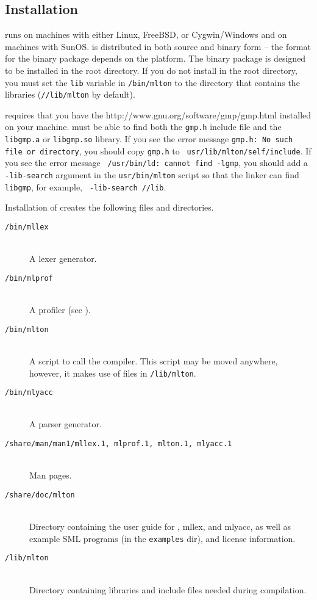 %
\subsection{Installation}
%
{\mlton} runs on {\intel} machines with either Linux, FreeBSD, or
Cygwin/Windows and on {\sparc} machines with SunOS.  {\mlton} is
distributed in both source and binary form -- the format for the
binary package depends on the platform.  The binary package is
designed to be installed in the root directory.  If you do not install
{\mlton} in the root directory, you must set the {\tt lib} variable in
{\tt \prefix/bin/mlton} to the directory that contains the libraries
({\tt /\prefix/lib/mlton} by default).

{\mlton} requires that you have the
		  {http://www.gnu.org/software/gmp/gmp.html}
installed on your machine.  {\mlton} must be able to find both the
{\tt gmp.h} include file and the {\tt libgmp.a} or {\tt libgmp.so}
library. If you see the error message {\tt gmp.h: No such file or
directory}, you should copy {\tt gmp.h} to {\tt
usr/lib/mlton/self/include}.  If you see the error message {\tt
/usr/bin/ld: cannot find -lgmp}, you 
should add a {\tt -lib-search} argument in the {\tt usr/bin/mlton}
script so that the linker can find {\tt libgmp}, for example, {\tt
-lib-search /\prefix/lib}.

Installation of {\mlton} creates the following files and directories.

\newcommand{\place}[1]{\item[\tt #1]\hspace{1in}\\}

\begin{description}

\place{\prefix/bin/mllex}
A lexer generator.

\place{\prefix/bin/mlprof}
A profiler (see ).

\place{\prefix/bin/mlton}
A script to call the compiler.
This script may be moved anywhere, however,
it makes use of files in {\tt \prefix/lib/mlton}.

\place{\prefix/bin/mlyacc}
A parser generator.

\place{\prefix/share/man/man1/mllex.1, mlprof.1, mlton.1, mlyacc.1}
Man pages.

\place{\prefix/share/doc/mlton}
Directory containing the user guide for {\mlton}, mllex, and mlyacc,
as well as example SML programs (in the {\tt examples} dir), and
license information.

\place{\prefix/lib/mlton}
Directory containing libraries and include files needed during
compilation.

\end{description}

